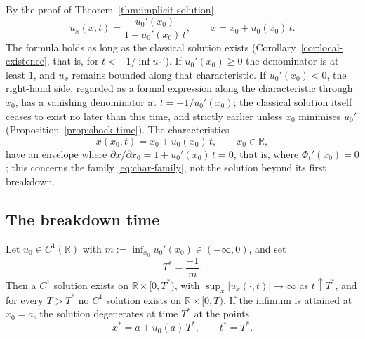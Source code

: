 By the proof of Theorem~\ref{thm:implicit-solution},
\begin{equation}
  \label{eq:ux-formula}
  u_x(x,t) = \frac{u_0'(x_0)}{1 + u_0'(x_0)\, t}, \qquad x = x_0 + u_0(x_0)\, t.
\end{equation}
The formula holds as long as the classical solution exists
(Corollary~\ref{cor:local-existence}, that is, for $t<-1/\inf u_0'$). If
$u_0'(x_0) \geq 0$ the denominator is at least $1$, and $u_x$ remains bounded
along that characteristic. If $u_0'(x_0) < 0$, the right-hand side, regarded as
a formal expression along the characteristic through $x_0$, has a vanishing
denominator at $t = -1/u_0'(x_0)$; the classical solution itself ceases to exist
no later than this time, and strictly earlier unless $x_0$ minimises $u_0'$
(Proposition~\ref{prop:shock-time}). The characteristics
\begin{equation}
  \label{eq:char-family}
  x(x_0, t) = x_0 + u_0(x_0)\, t, \qquad x_0 \in \mathbb{R},
\end{equation}
have an envelope where $\partial x/\partial x_0 = 1 + u_0'(x_0)\,t = 0$, that
is, where $\Phi_t'(x_0)=0$; this concerns the family \eqref{eq:char-family},
not the solution beyond its first breakdown.

\subsection{The breakdown time}
\label{subsec:shock-time}

\begin{proposition}
\label{prop:shock-time}
Let $u_0 \in C^1(\mathbb{R})$ with $m := \inf_{x_0} u_0'(x_0)\in(-\infty,0)$, and
set
\begin{equation}
  \label{eq:shock-time}
  T^* = \frac{-1}{m}.
\end{equation}
Then a $C^1$ solution exists on $\mathbb{R} \times [0,T^*)$, with
$\sup_x|u_x(\cdot,t)|\to\infty$ as $t\uparrow T^*$, and for every $T>T^*$ no
$C^1$ solution exists on $\mathbb{R}\times[0,T)$. If the infimum is attained at
$x_0=a$, the solution degenerates at time $T^*$ at the points
\begin{equation}
  \label{eq:shock-location}
  x^* = a + u_0(a)\, T^*, \qquad t^* = T^*.
\end{equation}
\end{proposition}

